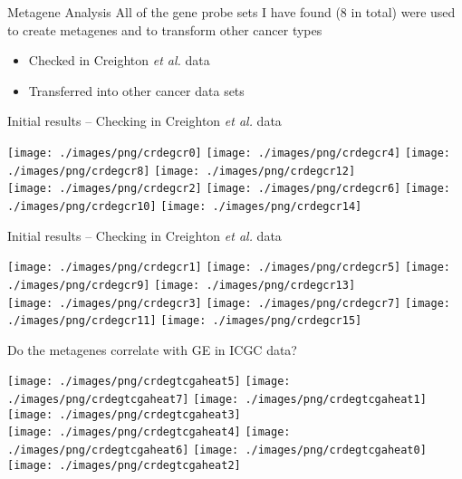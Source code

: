 \documentclass[handout]{beamer}
\begin{document}
\begin{frame}{Metagene Analysis}
	All of the gene probe sets I have found (8 in total) were used to create metagenes and to transform other cancer types
	\begin{itemize}
		\item Checked in Creighton \textit{et al.} data
		\item Transferred into other cancer data sets
	\end{itemize}
\end{frame}

\begin{frame}{Initial results -- Checking in Creighton \textit{et al.} data}
	\begin{adjustwidth}{-1.5em}{-1.5em}
		\texttt{[image: ./images/png/crdegcr0]}
		\texttt{[image: ./images/png/crdegcr4]}
		\texttt{[image: ./images/png/crdegcr8]}
		\texttt{[image: ./images/png/crdegcr12]}\\
		\texttt{[image: ./images/png/crdegcr2]}
		\texttt{[image: ./images/png/crdegcr6]}
		\texttt{[image: ./images/png/crdegcr10]}
		\texttt{[image: ./images/png/crdegcr14]}
	\end{adjustwidth}
\end{frame}

\begin{frame}{Initial results -- Checking in Creighton \textit{et al.} data}
	\begin{adjustwidth}{-1.5em}{-1.5em}
		\texttt{[image: ./images/png/crdegcr1]}
		\texttt{[image: ./images/png/crdegcr5]}
		\texttt{[image: ./images/png/crdegcr9]}
		\texttt{[image: ./images/png/crdegcr13]}\\
		\texttt{[image: ./images/png/crdegcr3]}
		\texttt{[image: ./images/png/crdegcr7]}
		\texttt{[image: ./images/png/crdegcr11]}
		\texttt{[image: ./images/png/crdegcr15]}
	\end{adjustwidth}
\end{frame}

\begin{frame}{Do the metagenes correlate with GE in ICGC data?}
	\begin{adjustwidth}{-1.5em}{-1.5em}
		\texttt{[image: ./images/png/crdegtcgaheat5]}
		\texttt{[image: ./images/png/crdegtcgaheat7]}
		\texttt{[image: ./images/png/crdegtcgaheat1]}
		\texttt{[image: ./images/png/crdegtcgaheat3]}\\
		\texttt{[image: ./images/png/crdegtcgaheat4]}
		\texttt{[image: ./images/png/crdegtcgaheat6]}
		\texttt{[image: ./images/png/crdegtcgaheat0]}
		\texttt{[image: ./images/png/crdegtcgaheat2]}
	\end{adjustwidth}
\end{frame}
\end{document}
